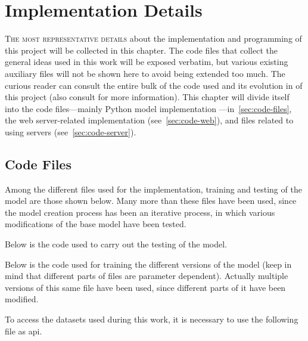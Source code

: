 

\chapter{Implementation Details}\label{cha:code}


\lettrine{T}{he most representative details} about the implementation and
programming of this project will be collected in this chapter. The code files
that collect the general ideas used in this work will be exposed verbatim, but
various existing auxiliary files will not be shown here to avoid being extended
too much. The curious reader can consult the entire bulk of the code used and
its evolution in
 of this project (also consult
 for more information). This chapter
will divide itself into the code files---mainly Python model implementation
---in\ \vref{sec:code-files}, the web server-related implementation (see\
\vref{sec:code-web}), and files related to using servers (see\
\vref{sec:code-server}).


\section{Code Files}\label{sec:code-files}

Among the different files used for the implementation, training and testing of
the model are those shown below. Many more than these files have been used,
since the model creation process has been an iterative process, in which
various modifications of the base model have been tested.

Below is the code used to carry out the testing of the model.


Below is the code used for training the different versions of the model (keep
in mind that different parts of files are parameter dependent). Actually
multiple versions of this same file have been used, since different parts of it
have been modified.


To access the datasets used during this work, it is necessary to use the
following file as \gls{api}.

